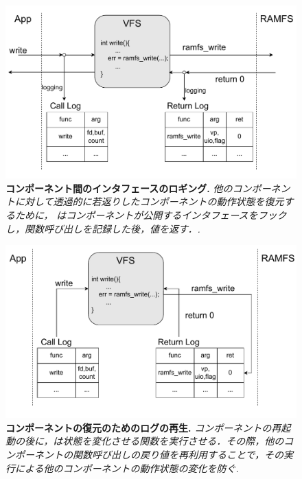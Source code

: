\begin{figure}[t]
    \centering
    \includegraphics[width=\linewidth]{img/logging.pdf}
    \vspace{-5mm}
    \caption{\textbf{コンポーネント間のインタフェースのロギング.} \textit{他のコンポーネントに対して透過的に若返りしたコンポーネントの動作状態を復元するために，{\sysname} はコンポーネントが公開するインタフェースをフックし，関数呼び出しを記録した後，値を返す．.}}
    \label{fig:logging}
\end{figure}

\begin{figure}[t]
    \centering
    \includegraphics[width=\linewidth]{img/playlog.pdf}
    \caption{\textbf{コンポーネントの復元のためのログの再生.} \textit{コンポーネントの再起動の後に，\sysname は状態を変化させる関数を実行させる．その際，他のコンポーネントの関数呼び出しの戻り値を再利用することで，その実行による他のコンポーネントの動作状態の変化を防ぐ.}}
    \label{fig:restoration}
\end{figure}

